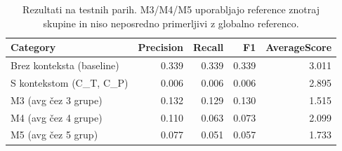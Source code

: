\begin{table}[h]
\centering
\caption{Rezultati na testnih parih. M3/M4/M5 uporabljajo reference znotraj skupine in niso neposredno primerljivi z globalno referenco.}
\label{tab:table_4_5}
\begin{tabular}{lrrrr}
\toprule
Category & Precision & Recall & F1 & AverageScore \\
\midrule
Brez konteksta (baseline) & 0.339 & 0.339 & 0.339 & 3.011 \\
S kontekstom (C\_T, C\_P) & 0.006 & 0.006 & 0.006 & 2.895 \\
M3 (avg čez 3 grupe) & 0.132 & 0.129 & 0.130 & 1.515 \\
M4 (avg čez 4 grupe) & 0.110 & 0.063 & 0.073 & 2.099 \\
M5 (avg čez 5 grup) & 0.077 & 0.051 & 0.057 & 1.733 \\
\bottomrule
\end{tabular}

\end{table}
